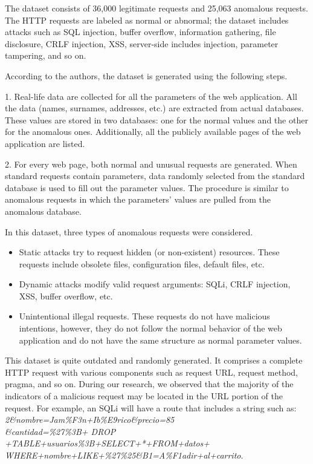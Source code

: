 The dataset consists of 36,000 legitimate requests and 25,063 anomalous requests. The HTTP requests are labeled as normal or abnormal; the dataset includes attacks such as SQL injection, buffer overflow, information gathering, file disclosure, CRLF injection, XSS, server-side includes injection, parameter tampering, and so on. 

According to the authors, the dataset is generated using the following steps.

1.	Real-life data are collected for all the parameters of the web application. All the data (names, surnames, addresses, etc.) are extracted from actual databases. These values are stored in two databases: one for the normal values and the other for the anomalous ones. Additionally, all the publicly available pages of the web application are listed. 

2.	For every web page, both normal and unusual requests are generated. When standard requests contain parameters, data randomly selected from the standard database is used to fill out the parameter values. The procedure is similar to anomalous requests in which the parameters' values are pulled from the anomalous database.  

In this dataset, three types of anomalous requests were considered. 
\begin{itemize}
	\item Static attacks try to request hidden (or non-existent) resources. These requests include obsolete files, configuration files, default files, etc. 
	\item Dynamic attacks modify valid request arguments: SQLi, CRLF injection, XSS, buffer overflow, etc.
	\item Unintentional illegal requests. These requests do not have malicious intentions, however, they do not follow the normal behavior of the web application and do not have the same structure as normal parameter values.
\end{itemize}

This dataset is quite outdated and randomly generated. It comprises a complete HTTP request with various components such as request URL, request method, pragma, and so on. During our research, we observed that the majority of the indicators of a malicious request may be located in the URL portion of the request. For example, an SQLi will have a route that includes a string such as: \textit{2\&nombre=Jam\%F3n+Ib\%E9rico\&precio=85 \\ \&cantidad=\%27\%3B+  DROP +TABLE+usuarios\%3B+SELECT+*+FROM+datos+ \\ WHERE+nombre+LIKE+\%27\%25\&B1=A\%F1adir+al+carrito}.

